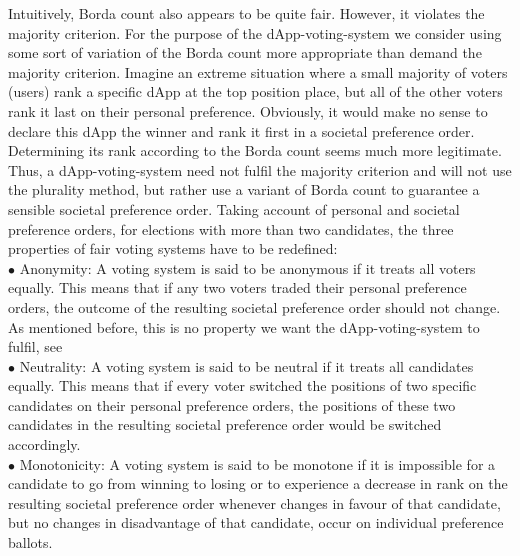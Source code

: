 Intuitively, Borda count also appears to be quite fair. However, it violates the majority criterion. For the purpose of the dApp-voting-system we consider using some sort of variation of the Borda count more appropriate than demand the majority criterion. Imagine an extreme situation where a small majority of voters (users) rank a specific dApp at the top position place, but all of the other voters rank it last on their personal preference. Obviously, it would make no sense to declare this dApp the winner and rank it first in a societal preference order. Determining its rank according to the Borda count seems much more legitimate. Thus, a dApp-voting-system need not fulfil the majority criterion and will not use the plurality method, but rather use a variant of Borda count to guarantee a sensible societal preference order. Taking account of personal and societal preference orders, for elections with more than two candidates, the three properties of fair voting systems have to be redefined: \\
$\bullet$ Anonymity: A voting system is said to be anonymous if it treats all voters equally. This means that if any two voters traded their personal preference orders, the outcome of the resulting societal preference order should not change. \\
As mentioned before, this is no property we want the dApp-voting-system to fulfil, see \\ %
$\bullet$ Neutrality: A voting system is said to be neutral if it treats all candidates equally. This means that if every voter switched the positions of two specific candidates on their personal preference orders, the positions of these two candidates in the resulting societal preference order would be switched accordingly. \\
$\bullet$ Monotonicity: A voting system is said to be monotone if it is impossible for a candidate to go from winning to losing or to experience a decrease in rank on the resulting societal preference order whenever changes in favour of that candidate, but no changes in disadvantage of that candidate, occur on individual preference ballots. \\

